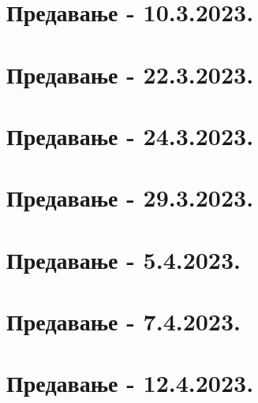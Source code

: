 \documentclass{tufte-handout} %
\theoremstyle{definition}
\theoremstyle{remark}
\begin{document}
\section{Предавање - 10.3.2023.}
\section{Предавање - 22.3.2023.}
\section{Предавање - 24.3.2023.}
\section{Предавање - 29.3.2023.}
\section{Предавање - 5.4.2023.}
\section{Предавање - 7.4.2023.}
\section{Предавање - 12.4.2023.}
\end{document}
